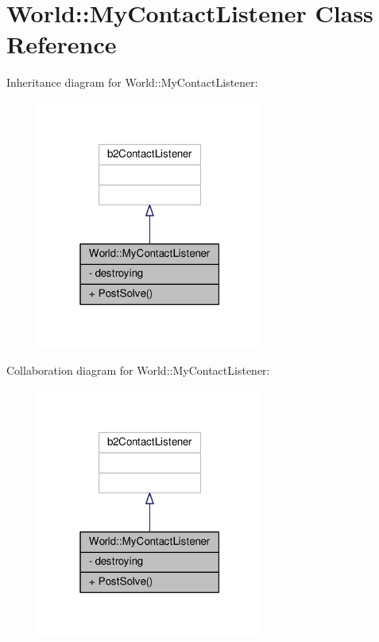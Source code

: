 \hypertarget{classWorld_1_1MyContactListener}{}\section{World\+:\+:My\+Contact\+Listener Class Reference}
\label{classWorld_1_1MyContactListener}


Inheritance diagram for World\+:\+:My\+Contact\+Listener\+:
\nopagebreak
\begin{figure}[H]
\begin{center}
\leavevmode
\includegraphics[width=211pt]{classWorld_1_1MyContactListener__inherit__graph}
\end{center}
\end{figure}


Collaboration diagram for World\+:\+:My\+Contact\+Listener\+:
\nopagebreak
\begin{figure}[H]
\begin{center}
\leavevmode
\includegraphics[width=211pt]{classWorld_1_1MyContactListener__coll__graph}
\end{center}
\end{figure}
